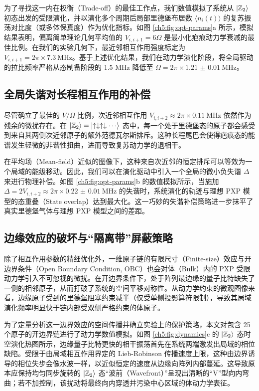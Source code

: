\documentclass[../main.tex]{subfiles}
\begin{document}
为了寻找这一内在权衡（Trade-off）的最佳工作点，我们数值模拟了系统从 $\ket{\mathbb{Z}_2}$ 初态出发的受限演化，并以演化多个周期后局部里德堡布居数 $\langle n_i(t) \rangle$ 的复苏振荡对比度（或多体保真度）作为优化指标。如图 \ref{ch5:fig:opt-params}a 所示，模拟结果表明，偏离简单理论几何平均值的 $V_{i,i+1} = 6\Omega$ 是最小化疤痕动力学衰减的最佳比例。在我们的实验几何下，最近邻相互作用强度标定为 $V_{i,i+1} = 2\pi \times \SI{7.3}{\MHz}$。基于上述优化结果，我们在动力学演化阶段，将全局驱动的拉比频率严格从态制备阶段的 1.5 MHz 降低至 $\Omega = 2\pi \times \SI{1.21(1)}{\MHz}$。

\subsection{全局失谐对长程相互作用的补偿}

尽管确立了最佳的 $V/\Omega$ 比例，次近邻相互作用 $V_{i,i+2} \approx 2\pi \times \SI{0.11}{\MHz}$ 依然作为残余的微扰存在。在 $\ket{\mathbb{Z}_2} = \ket{\uparrow\downarrow\uparrow\downarrow\cdots}$ 态中，每一个处于里德堡态的原子都会感受到来自其两侧次近邻原子的额外范德瓦尔斯排斥。这种长程尾巴会使得疤痕态的能谱发生轻微的非谐性扭曲，进而导致复苏动力学的退相干。

在平均场（Mean-field）近似的图像下，这种来自次近邻的恒定排斥可以等效为一个局域的能级移动。因此，我们可以在演化驱动中引入一个全局的微小负失谐 $\Delta$ 来进行物理补偿。如图 \ref{ch5:fig:opt-params}b 的数值模拟所示，当施加 $\Delta = 2V_{i,i+2} \approx 2\pi \times \SI{0.22(1)}{\MHz}$ 的失谐时，系统演化的轨迹与理想 PXP 模型的态重叠（State overlap）达到最大化。这一巧妙的失谐补偿策略进一步抹平了真实里德堡气体与理想 PXP 模型之间的差距。

\subsection{边缘效应的破坏与“隔离带”屏蔽策略}

除了相互作用参数的精细优化外，一维原子链的有限尺寸（Finite-size）效应与开边界条件（Open Boundary Condition, OBC）也会对体（Bulk）内的 PXP 受限动力学引入不可忽视的微扰。在开边界条件下，处于阵列最边缘的量子比特缺失了一侧的相邻原子，从而打破了系统的空间平移对称性。从动力学约束的微观图像来看，边缘原子受到的里德堡阻塞约束减半（仅受单侧投影算符限制），导致其局域演化频率明显快于链内部受双侧严格约束的体原子。

为了定量分析这一边界效应的空间传播并确立实验上的保护策略，本文对包含 25 个原子的开边界链进行了动力学数值模拟。如图 \ref{ch5:fig:dynamics}c 的 $\ket{\mathbb{Z}_2}$ 态时空演化热图所示，边缘量子比特更快的相干振荡首先在系统两端激发出局域的相位缺陷。受限于由局域相互作用界定的 Lieb-Robinson 传播速度上限，这种由边界诱导的相位失步会像水波一样，以近似恒定的速度从边缘向阵列内部蔓延。这导致原本应保持均匀同步旋转的 $\ket{\mathbb{Z}_2}$ 态“波前（Wavefront）”呈现出清晰的“V”型向内弯曲；若不加控制，该扰动将最终向内穿透并污染中心区域的体动力学表征。
\end{document}
